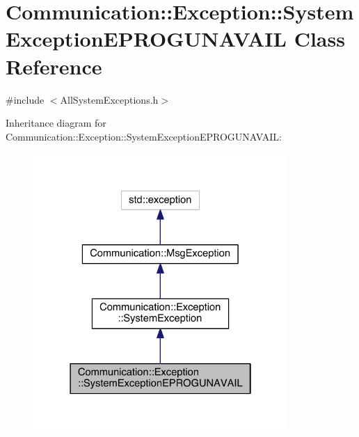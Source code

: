 \hypertarget{class_communication_1_1_exception_1_1_system_exception_e_p_r_o_g_u_n_a_v_a_i_l}{}\section{Communication\+:\+:Exception\+:\+:System\+Exception\+E\+P\+R\+O\+G\+U\+N\+A\+V\+A\+I\+L Class Reference}
\label{class_communication_1_1_exception_1_1_system_exception_e_p_r_o_g_u_n_a_v_a_i_l}


{\ttfamily \#include $<$All\+System\+Exceptions.\+h$>$}



Inheritance diagram for Communication\+:\+:Exception\+:\+:System\+Exception\+E\+P\+R\+O\+G\+U\+N\+A\+V\+A\+I\+L\+:\nopagebreak
\begin{figure}[H]
\begin{center}
\leavevmode
\includegraphics[width=274pt]{class_communication_1_1_exception_1_1_system_exception_e_p_r_o_g_u_n_a_v_a_i_l__inherit__graph}
\end{center}
\end{figure}


